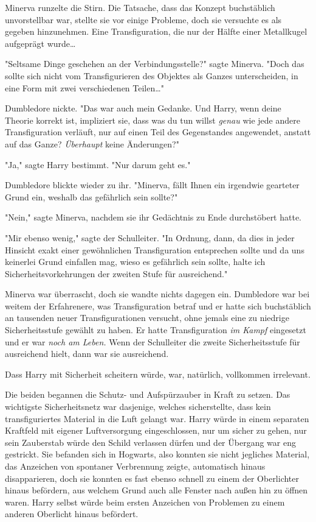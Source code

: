 {Minerva runzelte die Stirn. Die Tatsache, dass das Konzept buchstäblich unvorstellbar war, stellte sie vor einige Probleme, doch sie versuchte es als gegeben hinzunehmen. Eine Transfiguration, die nur der Hälfte einer Metallkugel aufgeprägt wurde…

"Seltsame Dinge geschehen an der Verbindungsstelle?" sagte Minerva. "Doch das sollte sich nicht vom Transfigurieren des Objektes als Ganzes unterscheiden, in eine Form mit zwei verschiedenen Teilen…"

Dumbledore nickte. "Das war auch mein Gedanke. Und Harry, wenn deine Theorie korrekt ist, impliziert sie, dass was du tun willst \emph{genau} wie jede andere Transfiguration verläuft, nur auf einen Teil des Gegenstandes angewendet, anstatt auf das Ganze? \emph{Überhaupt} keine Änderungen?"

"Ja," sagte Harry bestimmt. "Nur darum geht es."

Dumbledore blickte wieder zu ihr. "Minerva, fällt Ihnen ein irgendwie gearteter Grund ein, weshalb das gefährlich sein sollte?"

"Nein," sagte Minerva, nachdem sie ihr Gedächtnis zu Ende durchstöbert hatte.

"Mir ebenso wenig," sagte der Schulleiter. "In Ordnung, dann, da dies in jeder Hinsicht exakt einer gewöhnlichen Transfiguration entsprechen sollte und da uns keinerlei Grund einfallen mag, wieso es gefährlich sein sollte, halte ich Sicherheitsvorkehrungen der zweiten Stufe für ausreichend."

Minerva war überrascht, doch sie wandte nichts dagegen ein. Dumbledore war bei weitem der Erfahrenere, was Transfiguration betraf und er hatte sich buchstäblich an tausenden neuer Transfigurationen versucht, ohne jemals eine zu niedrige Sicherheitsstufe gewählt zu haben. Er hatte Transfiguration \emph{im Kampf} eingesetzt und er war \emph{noch am Leben.} Wenn der Schulleiter die zweite Sicherheitsstufe für ausreichend hielt, dann war sie ausreichend.

Dass Harry mit Sicherheit scheitern würde, war, natürlich, vollkommen irrelevant.

Die beiden begannen die Schutz- und Aufspürzauber in Kraft zu setzen. Das wichtigste Sicherheitsnetz war dasjenige, welches sicherstellte, dass kein transfiguriertes Material in die Luft gelangt war. Harry würde in einem separaten Kraftfeld mit eigener Luftversorgung eingeschlossen, nur um sicher zu gehen, nur sein Zauberstab würde den Schild verlassen dürfen und der Übergang war eng gestrickt. Sie befanden sich in Hogwarts, also konnten sie nicht jegliches Material, das Anzeichen von spontaner Verbrennung zeigte, automatisch hinaus disapparieren, doch sie konnten es fast ebenso schnell zu einem der Oberlichter hinaus befördern, aus welchem Grund auch alle Fenster nach außen hin zu öffnen waren. Harry selbst würde beim ersten Anzeichen von Problemen zu einem anderen Oberlicht hinaus befördert.

}
